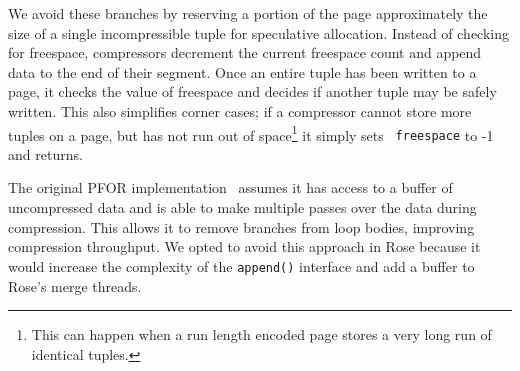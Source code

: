 \documentclass{vldb}
\newcommand{\rows}{Rose\xspace}
\newcommand{\rowss}{Rose's\xspace}
\begin{document}
We avoid these branches by reserving a portion of the page approximately the
size of a single incompressible tuple for speculative allocation.
Instead of checking for freespace, compressors decrement the current
freespace count and append data to the end of their segment.
Once an entire tuple has been written to a page,
it checks the value of freespace and decides if another tuple may be
safely written.  This also simplifies corner cases; if a
compressor cannot store more tuples on a page, but has not run out of
space\footnote{This can happen when a run length encoded page stores a
  very long run of identical tuples.} it simply sets {\tt
  freespace} to -1 and returns.



The original PFOR implementation~\cite{pfor} assumes it has access to
a buffer of uncompressed data and is able to make multiple
passes over the data during compression.  This allows it to remove
branches from loop bodies, improving compression throughput.  We opted
to avoid this approach in \rows because it would increase the complexity
of the {\tt append()} interface and add a buffer to \rowss merge threads.


\end{document}
